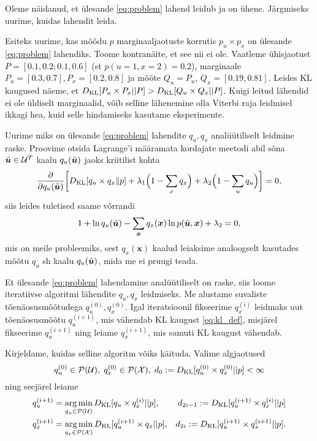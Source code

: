 Oleme näidanud, et ülesande \eqref{eq:problem} lahend leidub ja on ühene. Järgmiseks uurime, kuidas lahendit leida.

Esiteks uurime, kas mõõdu $p$ marginaaljaotuste korrutis $p_u \times p_x$ on ülesande \eqref{eq:problem} lahendiks. Toome kontranäite, et see nii ei ole. Vaatleme ühisjaotust $ P = [0.1, 0.2; 0.1, 0.6]$ (st $p(u=1,x=2)=0.2$), marginaale $P_u = [0.3, 0.7], P_x = [0.2, 0.8]$ ja mõõte $Q_u=P_u$, $Q_x = [0.19, 0.81]$. Leides KL kaugused näeme, et $D_{\mathrm{KL}}[P_u \times P_x || P] > D_{\mathrm{KL}}[Q_u \times Q_x || P]$. Kuigi leitud lähendid ei ole üldiselt marginaalid, võib selline lähenemine olla Viterbi raja leidmisel ikkagi hea, kuid selle hindamiseks kasutame eksperimente.

Uurime miks on ülesande \eqref{eq:problem} lahendite $q_u, q_x$ analüütiliselt leidmine raske. Proovime otsida Lagrange'i määramata kordajate meetodi abil sõna $\Tilde{\bm{u}} \in \mathcal{U}^T$ kaalu $q_u(\Tilde{\bm{u}})$ jaoks kriitilist kohta
$$\frac{\partial}{\partial q_u(\Tilde{\bm{u}})} \biggl[ D_{\mathrm{KL}} [q_u \times q_x \| p] + \lambda_1 \Bigl(1-\sum_x q_x\Bigr) +\lambda_2\Bigl(1-\sum_u q_u\Bigr)\biggr] = 0,$$
siis leides tuletised saame võrrandi
$$1 + \ln q_u(\Tilde{\bm{u}}) - \sum_{\bm{x}}q_x(\bm{x})\ln p(\Tilde{\bm{u}}, \bm{x}) + \lambda_2 = 0,$$
mis on meile probleemiks, sest $q_x(\bm{x})$ kaalud leiaksime analoogselt kasutades mõõtu $q_u$ sh kaalu $q_u(\Tilde{\bm{u}})$, mida me ei pruugi teada.

Et ülesande \eqref{eq:problem} lahendamine analüütiliselt on raske, siis loome iteratiivse algoritmi lähendite $q_u, q_x$ leidmiseks. Me alustame suvaliste tõenäosusmõõtudega $q_u^{(0)}, q_x^{(0)}$. Igal iteratsioonil fikseerime $q_x^{(i)}$ leidmaks uut tõenäosusmõõtu $q_u^{(i+1)}$, mis vähendab KL kaugust \eqref{eq:kl_def}, misjärel fikseerime $q_u^{(i+1)}$ ning leiame $q_x^{(i+1)}$, mis samuti KL kaugust vähendab.

Kirjeldame, kuidas selline algoritm võiks käituda. Valime algjaotused 
$$q_u^{(0)} \in \mathcal{P}(\mathcal{U}),\; q_x^{(0)} \in \mathcal{P}(\mathcal{X}),\; d_0 := D_{\mathrm{KL}}[q_u^{(0)} \times q_x^{(0)} || p] < \infty$$
ning seejärel leiame
\begin{align}
    \label{eq:update_u}
    q_u^{(i+1)} &= \operatorname*{arg\,min}_{q_u \in \mathcal{P}(\mathcal{U})} D_{\mathrm{KL}}[q_u \times q_x^{(i)} || p],& d_{2i -1} := D_{\mathrm{KL}}[q_u^{(i+1)} \times q_x^{(i)} || p] \\
    \label{eq:update_x}
     q_x^{(i+1)} &= \operatorname*{arg\,min}_{q_x \in \mathcal{P}(\mathcal{X})} D_{\mathrm{KL}}[q_u^{(i+1)} \times q_x || p],& d_{2i} := D_{\mathrm{KL}}[q_u^{(i+1)} \times q_x^{(i+1)} || p].
\end{align}

